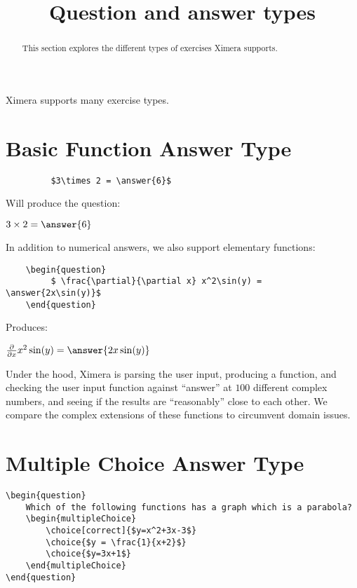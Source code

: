 \documentclass{ximera}
\title{Question and answer types}
\begin{document}
\begin{abstract}
  This section explores the different types of exercises Ximera supports. 
\end{abstract}

\maketitle

Ximera supports many exercise types.


\section{Basic Function Answer Type}	
\begin{verbatim}
         $3\times 2 = \answer{6}$
\end{verbatim}

Will produce the question:

\begin{question}
  $3\times 2 = \answer{6}$
\end{question}

In addition to numerical answers, we also support elementary functions:

\begin{verbatim}
    \begin{question}
         $ \frac{\partial}{\partial x} x^2\sin(y) =  \answer{2x\sin(y)}$
    \end{question}
\end{verbatim}

Produces:

\begin{question}
  $ \frac{\partial}{\partial x} x^2\sin(y) = \answer{2x\sin(y)}$
\end{question}

\begin{remark}
Under the hood, Ximera is parsing the user input, producing a
function, and checking the user input function against ``answer'' at
$100$ different complex numbers, and seeing if the results are
``reasonably'' close to each other.  We compare the complex extensions
of these functions to circumvent domain issues.
\end{remark}

\section{Multiple Choice Answer Type}

\begin{verbatim}
\begin{question}
	Which of the following functions has a graph which is a parabola?
	\begin{multipleChoice}
		\choice[correct]{$y=x^2+3x-3$}
		\choice{$y = \frac{1}{x+2}$}
		\choice{$y=3x+1$}
	\end{multipleChoice}
\end{question}
\end{verbatim}
\end{document}
